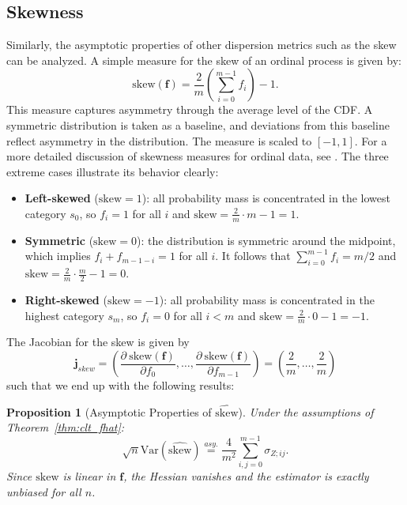 ﻿\documentclass[12pt,a4paper]{scrreprt}
\newtheorem{proposition}[theorem]{Proposition}
\theoremstyle{definition}
\begin{document}
\subsection*{Skewness}
Similarly, the asymptotic properties of other dispersion metrics such as the skew
can be analyzed. A simple measure for the skew of an ordinal process is given by:
\[\mathrm{skew}(\boldsymbol{f}) = \frac{2}{m} \left(\sum_{i=0}^{m-1}f_i\right) - 1.\]
This measure captures asymmetry through the average level of the CDF.
A symmetric distribution is taken as a baseline, and deviations from this
baseline reflect asymmetry in the distribution. The measure is scaled to
$[-1,1]$. For a more detailed discussion of skewness measures for ordinal
data, see \citet{klein_doll_2020}. The three extreme cases illustrate its
behavior clearly:
\begin{itemize}
    \item \textbf{Left-skewed} ($\mathrm{skew} = 1$): all probability mass is 
    concentrated in the lowest category $s_0$, so $f_i = 1$ for all $i$ and
    $\mathrm{skew} = \frac{2}{m} \cdot m - 1 = 1$.
    \item \textbf{Symmetric} ($\mathrm{skew} = 0$): the distribution is symmetric
    around the midpoint, which implies $f_i+ f_{m-1-i} = 1$ for all $i$. It follows that $\sum_{i=0}^{m-1} f_i = m/2$ and
    $\mathrm{skew} = \frac{2}{m} \cdot \frac{m}{2} - 1 = 0$.
    \item \textbf{Right-skewed} ($\mathrm{skew} = -1$): all probability mass is
    concentrated in the highest category $s_m$, so $f_i = 0$ for all $i < m$ and
    $\mathrm{skew} = \frac{2}{m} \cdot 0 - 1 = -1$.
\end{itemize}
The Jacobian for the skew is given by
\[\boldsymbol{j}_{skew} = \left(\frac{\partial ~ \mathrm{skew}(\boldsymbol{f})}{\partial f_0}, \ldots, \frac{\partial ~\mathrm{skew}(\boldsymbol{f})}{\partial f_{m-1}}\right) = \left(\frac{2}{m}, \ldots, \frac{2}{m}\right)\]
such that we end up with the following results:
\begin{proposition}[Asymptotic Properties of $\widehat{\mathrm{skew}}$]\label{prop:skew}
Under the assumptions of Theorem~\ref{thm:clt_fhat}:
\begin{equation*}\label{eq:var_skew}
    \sqrt{n}\mathrm{Var}(\widehat{\mathrm{skew}}) \overset{asy.}{=}
    \frac{4}{m^2}\sum_{i,j=0}^{m-1}\sigma_{Z;ij}.
\end{equation*}
Since $\mathrm{skew}$ is linear in $\boldsymbol{f}$, the Hessian vanishes and the
estimator is exactly unbiased for all $n$.
\end{proposition}
\end{document}
